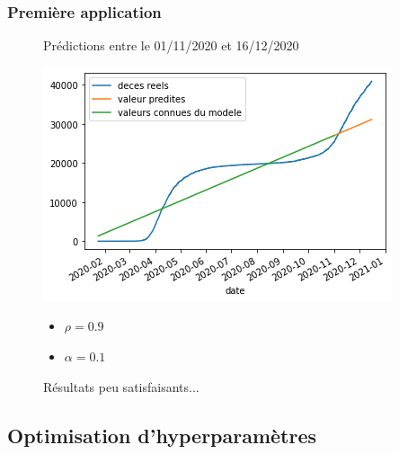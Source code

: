 \documentclass{beamer}[aspectratio = 43]
\begin{document}
\begin{frame}
	\frametitle{Première application}
	\begin{figure}
		Prédictions entre le 01/11/2020 et 16/12/2020
		\begin{minipage}{0.8\textwidth}
					\includegraphics[scale=0.6]{EN_2020-11-01}
		\end{minipage}%
		\begin{minipage}{0.2\textwidth}
			\begin{itemize}
			\item[] $\rho = 0.9$
			\item[] $\alpha = 0.1$
			\end{itemize}
		\end{minipage}
		\caption{Résultats peu satisfaisants...}
	\end{figure}
\end{frame}

\subsection*{Optimisation d'hyperparamètres}
\end{document}
